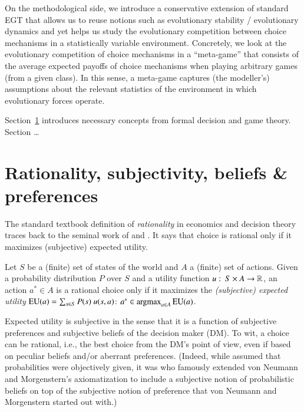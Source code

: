 \documentclass[fleqn,reqno,11pt]{article}
\begin{document}
On the methodological side, we introduce a conservative extension of standard EGT that allows
us to reuse notions such as evolutionary stability / evolutionary dynamics and yet helps us
study the evolutionary competition between choice mechanisms in a statistically variable
environment. Concretely, we look at the evolutionary competition of choice mechanisms in a
``meta-game'' that consists of the average expected payoffs of choice mechanisms when playing
arbitrary games (from a given class). In this sense, a meta-game captures (the modeller's)
assumptions about the relevant statistics of the environment in which evolutionary forces
operate.

Section~\ref{sec:rati--subj} introduces necessary concepts from formal decision and game
theory. Section \dots


\section{Rationality, subjectivity, beliefs \& preferences}
\label{sec:rati--subj}

The standard textbook definition of \textit{rationality} in economics and decision theory
traces back to the seminal work of \citet{Neumannvon-NeumannMorgenstern1944:Theory-of-Games}
and \citet{Savage1954:The-Foundations}. It says that choice is rational only if it maximizes
(subjective) expected utility.

\begin{definition}
  \label{def:rationality}
  Let $S$ be a (finite) set of states of the world and $A$ a (finite) set of actions. Given a
  probability distribution $P$ over $S$ and a utility function
  $u \thinspace \colon \thinspace S \times A \rightarrow \mathbb{R} $, an action $a^* \in A$ is a rational choice
  only if it maximizes the \emph{(subjective) expected utility}
  $\EU(a) = \sum_{s \in S} P(s) \ u(s, a)$: $a^* \in \text{argmax}_{a \in A} \operatorname{EU}(a) $.
\end{definition}

\noindent Expected utility is subjective in the sense that it is a function of subjective
preferences and subjective beliefs of the decision maker (DM). To wit, a choice can be
rational, i.e., the best choice from the DM's point of view, even if based on peculiar beliefs
and/or aberrant preferences. (Indeed, while
\citeauthor{Neumannvon-NeumannMorgenstern1944:Theory-of-Games} assumed that probabilities were
objectively given, it was \citet{Savage1954:The-Foundations} who famously extended von Neumann
and Morgenstern's axiomatization to include a subjective notion of probabilistic beliefs on top
of the subjective notion of preference that von Neumann and Morgenstern started out with.)
\end{document}
